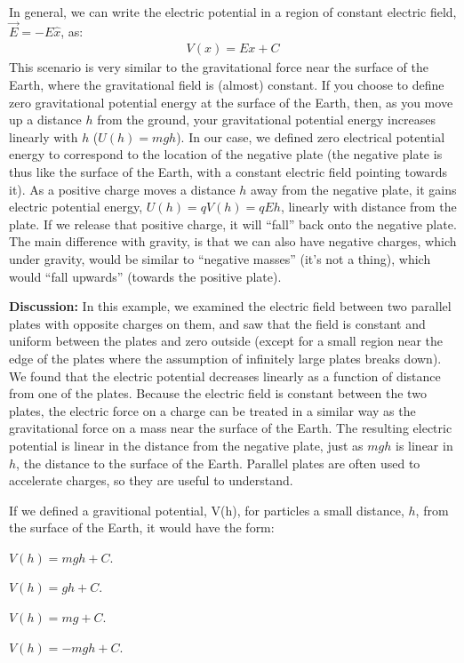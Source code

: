 \begin{example}
In general, we can write the electric potential in a region of constant electric field, $\vec E=-E\hat x$, as:
\begin{align*}
V(x)=Ex + C
\end{align*} 
This scenario is very similar to the gravitational force near the surface of the Earth, where the gravitational field is (almost) constant. If you choose to define zero gravitational potential energy at the surface of the Earth, then, as you move up a distance $h$ from the ground, your gravitational potential energy increases linearly with $h$ ($U(h)=mgh$). In our case, we defined zero electrical potential energy to correspond to the location of the negative plate (the negative plate is thus like the surface of the Earth, with a constant electric field pointing towards it). As a positive charge moves a distance $h$ away from the negative plate, it gains electric potential energy, $U(h)=qV(h)=qEh$, linearly with distance from the plate. If we release that positive charge, it will ``fall'' back onto the negative plate. The main difference with gravity, is that we can also have negative charges, which under gravity, would be similar to ``negative masses'' (it's not a thing), which would ``fall upwards'' (towards the positive plate).  

\textbf{Discussion:} In this example, we examined the electric field between two parallel plates with opposite charges on them, and saw that the field is constant and uniform between the plates and zero outside (except for a small region near the edge of the plates where the assumption of infinitely large plates breaks down). We found that the electric potential decreases linearly as a function of distance from one of the plates. Because the electric field is constant between the two plates, the electric force on a charge can be treated in a similar way as the gravitational force on a mass near the surface of the Earth. The resulting electric potential is linear in the distance from the negative plate, just as $mgh$ is linear in $h$, the distance to the surface of the Earth. Parallel plates are often used to accelerate charges, so they are useful to understand. 
\end{example}

%
\begin{checkpoint}
	\begin{MCquestion}{If we defined a gravitional potential, V(h), for particles a small distance, $h$, from the surface of the Earth, it would have the form:}
		\item $V(h) = mgh + C$.
		\item $V(h) = gh + C$. \correct
		\item $V(h) = mg + C$.
		\item $V(h) = -mgh + C$.
	\end{MCquestion}
\end{checkpoint}


